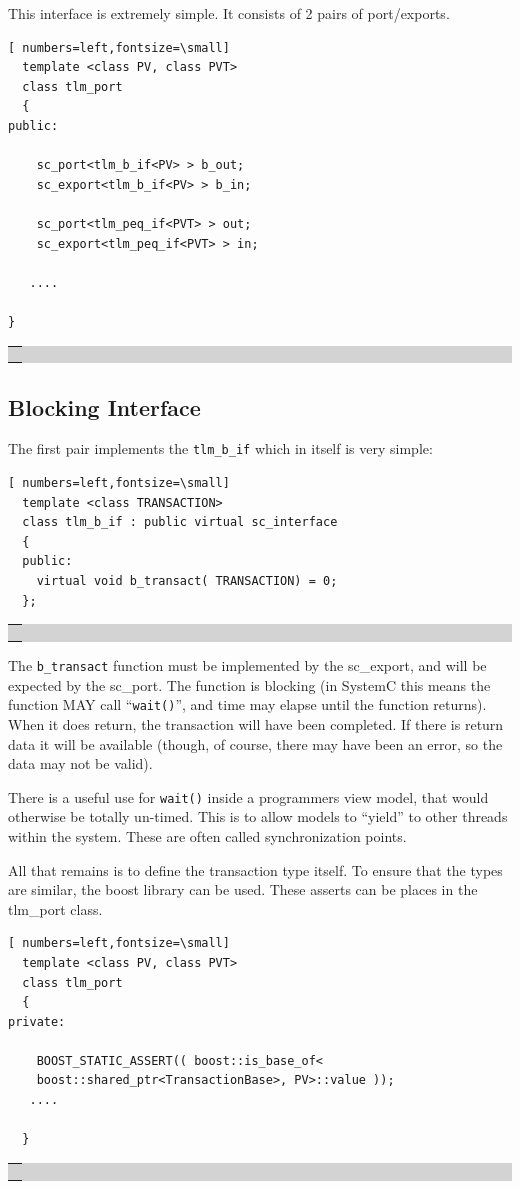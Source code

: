 \documentclass[12pt,oneside]{gsbook}
\def\example#1{\begin{center}\colorbox{lightgrey}{\begin{tabular}{|p{0.6\paperwidth}|}\hline\\#1\\ \\ \hline\end{tabular}}\end{center}}
\newenvironment{exampleenv}{\begin{lrbox}{\examplebox}\begin{minipage}{0.6\paperwidth}}{\end{minipage}\end{lrbox}\example{\usebox{\examplebox}}}
\begin{document}
This interface is extremely simple. It consists of 2 pairs of
port/exports.

\begin{exampleenv}
\begin{Verbatim}[ numbers=left,fontsize=\small]
  template <class PV, class PVT>
  class tlm_port
  {
public:

    sc_port<tlm_b_if<PV> > b_out;
    sc_export<tlm_b_if<PV> > b_in;

    sc_port<tlm_peq_if<PVT> > out;
    sc_export<tlm_peq_if<PVT> > in;

   ....

}
\end{Verbatim}
\end{exampleenv}


\subsection{Blocking Interface}

The first pair implements the {\tt tlm\_b\_if} which in itself is very
simple:

\begin{exampleenv}
\begin{Verbatim}[ numbers=left,fontsize=\small]
  template <class TRANSACTION>
  class tlm_b_if : public virtual sc_interface
  {
  public:
    virtual void b_transact( TRANSACTION) = 0;
  };
\end{Verbatim}
\end{exampleenv}

The {\tt b\_transact} function must be implemented by the sc\_export, and will
be expected by the sc\_port. The function is blocking (in  SystemC
this means the function MAY call ``{\tt wait()}'', and time may elapse until
the function returns). When it does return, the transaction will have been
completed. If there is return data it will be available (though, of
course, there may have been an error, so the data may not be valid).

There is a useful use for {\tt wait()} inside a programmers view model,
that would otherwise be totally un-timed. This is to allow models to
``yield'' to other threads within the system. These are often called
synchronization points.

All that remains is to define the transaction type itself. To ensure
that the types are similar, the boost library can be used. These asserts
can be places in the tlm\_port class.


\begin{exampleenv}
\begin{Verbatim}[ numbers=left,fontsize=\small]
  template <class PV, class PVT>
  class tlm_port
  {
private:
    
    BOOST_STATIC_ASSERT(( boost::is_base_of<
	boost::shared_ptr<TransactionBase>, PV>::value ));
   ....

  }
\end{Verbatim}
\end{exampleenv}
\end{document}
